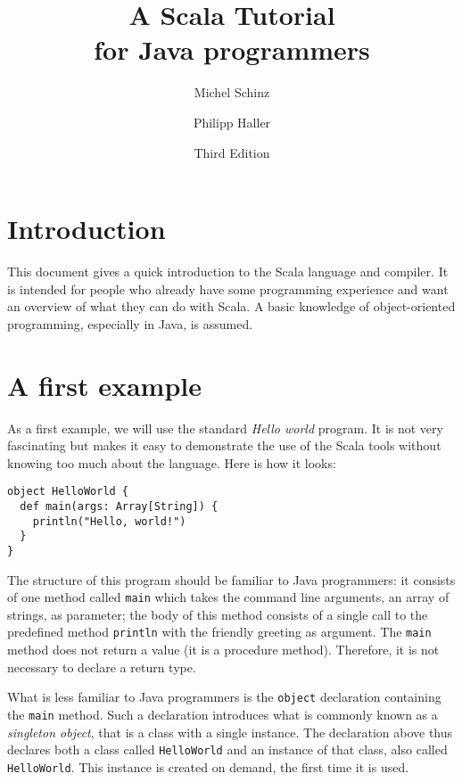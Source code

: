 \documentclass[a4paper,11pt,twoside,titlepage]{article}
\begin{document}
\title{A Scala Tutorial \\\large for Java programmers}
\author{Michel Schinz \and Philipp Haller}
\date{Third Edition}
\maketitle

\thispagestyle{empty}
\cleardoublepage

\section*{Introduction}
\label{sec:introduction}

This document gives a quick introduction to the Scala language and
compiler. It is intended for people who already have some programming
experience and want an overview of what they can do with Scala. A
basic knowledge of object-oriented programming, especially in Java,
is assumed.

\section*{A first example}
\label{sec:first-example}

As a first example, we will use the standard \emph{Hello world}
program. It is not very fascinating but makes it easy to demonstrate
the use of the Scala tools without knowing too much about the
language. Here is how it looks:
\begin{lstlisting}
object HelloWorld {
  def main(args: Array[String]) {
    println("Hello, world!")
  }
}
\end{lstlisting}

The structure of this program should be familiar to Java programmers:
it consists of one method called \lstinline?main? which takes the command
line arguments, an array of strings, as parameter; the body of this
method consists of a single call to the predefined method \lstinline?println?
with the friendly greeting as argument. The \lstinline?main? method does not
return a value (it is a procedure method). Therefore, it is not necessary
to declare a return type.

What is less familiar to Java programmers is the \lstinline?object?
declaration containing the \lstinline?main? method. Such a declaration
introduces what is commonly known as a \emph{singleton object}, that
is a class with a single instance. The declaration above thus declares
both a class called \lstinline?HelloWorld? and an instance of that class,
also called \lstinline?HelloWorld?. This instance is created on demand,
the first time it is used.
\end{document}

